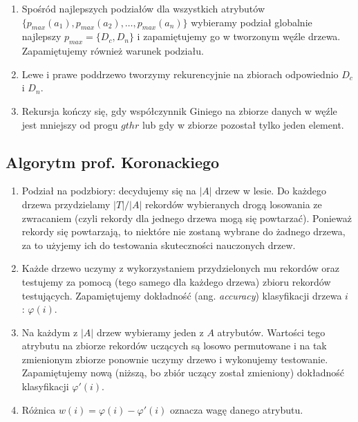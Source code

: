 \documentclass{article}
\begin{document}
\begin{enumerate}
	\item Spośród najlepszych podziałów dla wszystkich atrybutów \\
	$\{ p_{max}(a_1), p_{max}(a_2), \ldots, p_{max}(a_n) \}$ 
	wybieramy podział globalnie najlepszy $p_{max} = \{D_c, D_n\}$ i zapamiętujemy go w tworzonym węźle drzewa. Zapamiętujemy również warunek podziału. 
	\item Lewe i prawe poddrzewo tworzymy rekurencyjnie na zbiorach odpowiednio $D_c$ i $D_n$. 
	\item Rekursja kończy się, gdy współczynnik Giniego na zbiorze danych w węźle jest mniejszy od progu $gthr$ lub gdy w zbiorze pozostał tylko jeden element. 
\end{enumerate}

\subsection{Algorytm prof. Koronackiego} \label{sec:koronacki}
\begin{enumerate}
	\item Podział na podzbiory: decydujemy się na $\left|A\right|$ drzew w lesie. Do każdego	drzewa przydzielamy $\left|T\right| / \left|A\right|$ rekordów wybieranych drogą losowania ze zwracaniem (czyli rekordy dla jednego drzewa mogą się powtarzać). Ponieważ rekordy się powtarzają, to niektóre nie zostaną wybrane do żadnego drzewa,
	za to użyjemy ich do testowania skuteczności nauczonych drzew. 
	\item Każde drzewo uczymy z wykorzystaniem przydzielonych mu rekordów oraz
	testujemy za pomocą (tego samego dla każdego drzewa) zbioru rekordów
	testujących. Zapamiętujemy dokładność (ang. \emph{accuracy}) klasyfikacji drzewa
	$i$ : $\varphi(i)$. 
	\item Na każdym z $\left|A\right|$ drzew wybieramy jeden z $A$ atrybutów. Wartości tego atrybutu na zbiorze rekordów uczących są losowo permutowane i na tak zmienionym zbiorze ponownie uczymy drzewo i wykonujemy testowanie.	Zapamiętujemy nową (niższą, bo zbiór uczący został zmieniony) dokładność klasyfikacji $\varphi'(i)$. 
	\item Różnica $w(i) = \varphi(i) − \varphi'(i)$ oznacza wagę danego atrybutu.
\end{enumerate}
\end{document}
